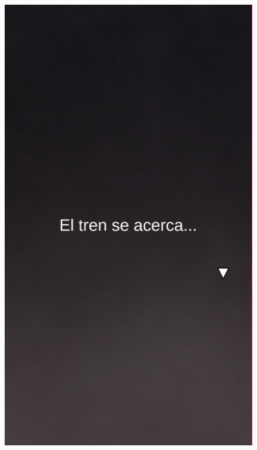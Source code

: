 \begin{figure}[ht]
	\centering
	\begin{minipage}{0.45\textwidth}
   		\includegraphics[scale=.5]{imgs/screenshot01.png}
	\end{minipage}
	\begin{minipage}{0.45\textwidth}
		\begin{flushright}

\end{flushright}
\end{minipage}
\end{figure}
